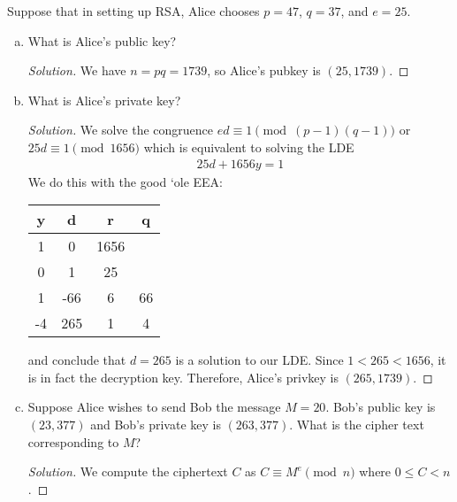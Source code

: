 \documentclass{agony}
\begin{document}
\question Suppose that in setting up RSA, Alice chooses $p = 47$, $q = 37$, and $e = 25$.
\begin{enumerate}[(a)]
  \item What is Alice's public key?
        \begin{proof}[Solution]
          We have $n = pq = 1739$, so Alice's pubkey is $(25, 1739)$.
        \end{proof}
  \item What is Alice's private key?
        \begin{proof}[Solution]
          We solve the congruence $ed \equiv 1 \pmod{(p-1)(q-1)}$ or $25d \equiv 1 \pmod{1656}$
          which is equivalent to solving the LDE
          \begin{align*}
            25d + 1656y = 1
          \end{align*}
          We do this with the good `ole EEA\@:
          \begin{center}
            \begin{tabular}{C|C|C|C}
              y  & d   & r    & q  \\   & 0   & 1656      \\
              0  & 1   & 25        \\
              1  & -66 & 6    & 66 \\
              -4 & 265 & 1    & 4
            \end{tabular}
          \end{center}
          and conclude that $d=265$ is a solution to our LDE\@.
          Since $1 < 265 < 1656$, it is in fact the decryption key.
          Therefore, Alice's privkey is $(265,1739)$.
        \end{proof}
  \item Suppose Alice wishes to send Bob the message $M = 20$.
        Bob's public key is $(23, 377)$ and Bob’s private key is $(263, 377)$.
        What is the cipher text corresponding to $M$?
        \begin{proof}[Solution]
          We compute the ciphertext $C$ as $C \equiv M^e \pmod{n}$ where $0 \leq C < n$.


\end{proof}
\end{enumerate}
\end{document}
